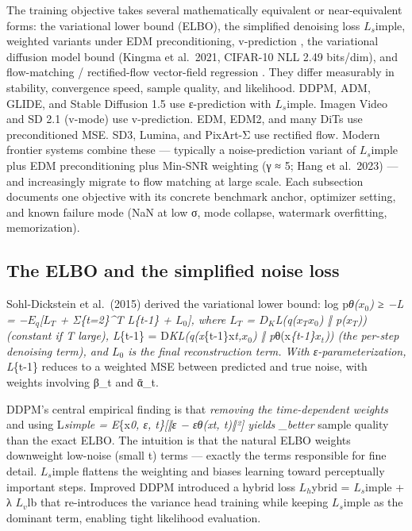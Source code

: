 \documentclass{article}
\begin{document}
The training objective takes several mathematically equivalent or near-equivalent forms: the variational lower bound (ELBO), the simplified denoising loss \(L_s\)imple, weighted variants under EDM preconditioning, v-prediction \citep{salimans2022progressivedistill}, the variational diffusion model bound (Kingma et al.~2021, CIFAR-10 NLL 2.49 bits/dim), and flow-matching / rectified-flow vector-field regression \citep{lipman2023flowmatchingforgen}. They differ measurably in stability, convergence speed, sample quality, and likelihood. DDPM, ADM, GLIDE, and Stable Diffusion 1.5 use ε-prediction with \(L_s\)imple. Imagen Video and SD 2.1 (v-mode) use v-prediction. EDM, EDM2, and many DiTs use preconditioned MSE. SD3, Lumina, and PixArt-Σ use rectified flow. Modern frontier systems combine these --- typically a noise-prediction variant of \(L_s\)imple plus EDM preconditioning plus Min-SNR weighting (γ ≈ 5; Hang et al.~2023) --- and increasingly migrate to flow matching at large scale. Each subsection documents one objective with its concrete benchmark anchor, optimizer setting, and known failure mode (NaN at low σ, mode collapse, watermark overfitting, memorization).

\subsection{The ELBO and the simplified noise loss}\label{the-elbo-and-the-simplified-noise-loss}

Sohl-Dickstein et al.~(2015) derived the variational lower bound: log p\emph{θ(\(x_0\)) ≥ −L = −\(E_q\){[}\(L_T\) + Σ\emph{\{t=2\}\^{}T L}\{t-1\} + \(L_0\){]}, where \(L_T\) = \(D_K\)L(q(\(x_T\)\textbar{}\(x_0\)) ‖ p(\(x_T\))) (constant if T large), L}\{t-1\} = D\emph{KL(q(x}\{t-1\}\textbar x\emph{t,\(x_0\)) ‖ p}θ(x\emph{\{t-1\}\textbar{}\(x_t\))) (the per-step denoising term), and \(L_0\) is the final reconstruction term. With ε-parameterization, L}\{t-1\} reduces to a weighted MSE between predicted and true noise, with weights involving β\_t and ᾱ\_t.

DDPM's central empirical finding is that \emph{removing the time-dependent weights} and using L\emph{simple = E}\{x\emph{0, ε, t\}{[}‖ε − ε\emph{θ(x}t, t)‖²{]} yields \_better} sample quality than the exact ELBO. The intuition is that the natural ELBO weights downweight low-noise (small t) terms --- exactly the terms responsible for fine detail. \(L_s\)imple flattens the weighting and biases learning toward perceptually important steps. Improved DDPM \citep{nichol2021improveddenoisingd} introduced a hybrid loss \(L_h\)ybrid = \(L_s\)imple + λ \(L_v\)lb that re-introduces the variance head training while keeping \(L_s\)imple as the dominant term, enabling tight likelihood evaluation.
\end{document}
